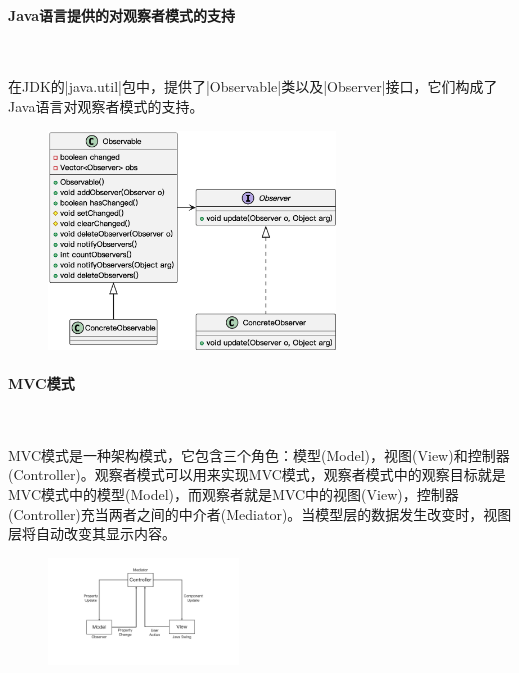 \paragraph*{Java语言提供的对观察者模式的支持}~{} \par
在JDK的\sverb|java.util|\;包中，提供了\sverb|Observable|\;类以及\sverb|Observer|\;接口，它们构成了Java语言对观察者模式的支持。
\begin{figure}[H]
    \vspace{-0.5em}
	\centering
	\includegraphics[width=0.68\textwidth]{images/观察者模式拓展1.eps}
    \vspace{-1em}
\end{figure}

\paragraph*{MVC模式}~{} \par
MVC模式是一种架构模式，它包含三个角色：模型(Model)，视图(View)和控制器(Controller)。观察者模式可以用来实现MVC模式，观察者模式中的观察目标就是MVC模式中的模型(Model)，而观察者就是MVC中的视图(View)，控制器(Controller)充当两者之间的中介者(Mediator)。当模型层的数据发生改变时，视图层将自动改变其显示内容。
\begin{figure}[H]
    \vspace{-0.5em}
	\centering
	\includegraphics[width=0.45\textwidth]{images/观察者模式拓展2.pdf}
    \vspace{-1em}
\end{figure}


